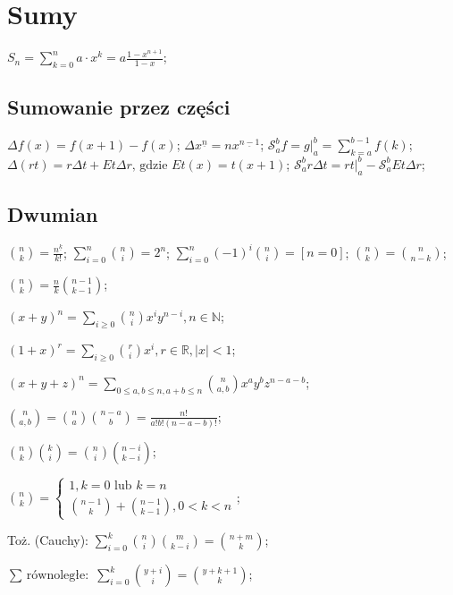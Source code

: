 \section{Sumy}

${S_n = \sum^{n}_{k = 0} a \cdot x^k} = {a \frac{1 - x^{n+1}}{1 - x}}$;

\subsection{Sumowanie przez części}

${\Delta f(x) = f(x + 1) - f(x)}$;
${\Delta x^{\underline{n}}} = {n x^{\underline{n - 1}}}$;
${\mathcal{S}^{b}_{a} f}={g |^b_a} = {\sum^{b - 1}_{k = a} f(k)}$;
${\Delta (rt)} = {r \Delta t + E t \Delta r \text{, gdzie } E t(x)} =
  {t(x + 1)}$;
${\mathcal{S}^{b}_{a} r \Delta t}= {r t |^b_a - \mathcal{S}^b_a E t \Delta r}$;

\subsection{Dwumian}

${\binom{n}{k} = {\frac{n^{\underline{k}}}{k!}}}$;
${\sum_{i = 0}^n \binom{n}{i} = 2^n}$;
${\sum_{i = 0}^{n} (-1)^i \binom{n}{i} = [ n = 0 ]}$;
$\binom{n}{k} = \binom{n}{n - k}$;

$\binom{n}{k} = \frac{n}{k} \binom{n - 1}{k - 1}$;

${(x + y)^n = \sum_{i \geq 0} \binom{n}{i} x^i y^{n-i}, n \in \mathbb{N}}$;

${(1 + x)^r = \sum_{i \geq 0} \binom{r}{i} x^i, r \in \mathbb{R}, |x| < 1}$;

$(x + y + z)^n =
  \sum_{0 \leq a, b \leq n, a+b \leq n} \binom{n}{a,b} x^a y^b z^{n-a-b}$;

$\binom{n}{a,b} = \binom{n}{a}\binom{n-a}{b} = \frac{n!}{a! b! (n - a - b)!}$;

$\binom{n}{k}\binom{k}{i} = \binom{n}{i}\binom{n-i}{k-i}$;

$\binom{n}{k} = \begin{cases}
    1, k = 0 \text{ lub } k = n \\
    \binom{n - 1}{k} + \binom{n - 1}{k - 1}, 0 < k < n
\end{cases}
$;

Toż. (Cauchy): $\sum^k_{i=0}\binom{n}{i}\binom{m}{k - i} = \binom{n + m}{k}$;

$\text{$\sum$ równoległe: } \sum^k_{i=0} \binom{y + i}{i} =
  \binom{y + k + 1}{k}$;

